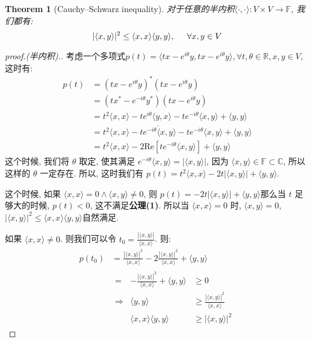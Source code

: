 \documentclass{article}
\newtheorem{theorem}{Theorem}
\def\<{\langle}
\def\>{\rangle}
\begin{document}
\begin{theorem}[Cauchy–Schwarz inequality]
  对于任意的半内积$\<\cdot,\cdot\>: V\times V\to \mathbb{F}$, 我们都有:
  \[|\<x, y\>|^2 \leq \<x, x\>\<y, y\>, \hspace{0.5cm} \forall x, y\in V\]
\end{theorem}
\begin{proof}[proof.(半内积).]
  考虑一个多项式$p(t) = \<tx - e^{i\theta}y, tx - e^{i\theta}y\>, \forall t, \theta\in\mathbb{R}, x, y\in V$, 这时有:
  \begin{align*}
    p(t) &= (tx - e^{i\theta}y)^*(tx - e^{i\theta}y) \\
         &= (tx^* - e^{-i\theta}y^*)(tx - e^{i\theta}y) \\
         &= t^2\<x, x\> - te^{i\theta}\<y, x\> - te^{-i\theta}\<x, y\> + \<y,y\> \\
         &= t^2\<x,x\> - \overline{te^{-i\theta}\<x, y\>}  - te^{-i\theta}\<x, y\> + \<y, y\> \\
    &= t^2\<x, x\> - 2\mathrm{Re}\left[te^{-i\theta}\<x, y\>\right] + \<y, y\>
  \end{align*}
  这个时候, 我们将 $\theta$ 取定, 使其满足 $e^{-i\theta} \<x, y\> = |\<x, y\>|$, 因为 $\<x, y\> \in \mathbb{F} \subset \mathbb{C}$, 所以这样的 $\theta$ 一定存在.
  所以, 这时我们有 $p(t) = t^2\<x,x\> - 2t|\<x, y\>| + \<y, y\>$.
  
  这个时候, 如果 $\<x, x\> = 0 \land \<x, y\> \not= 0$, 则 $p(t) = -2t|\<x, y\>| + \<y, y\>$那么当 $t$ 足够大的时候, $p(t) < 0$, 这不满足\textbf{公理(1)}.
  所以当 $\<x, x\> = 0$ 时, $\<x, y\> = 0$, $|\<x, y\>|^2 \leq \<x,x\>\<y,y\>$自然满足.

  如果 $\<x, x\> \not= 0$. 则我们可以令 $t_0 = \frac{|\<x, y\>|}{\<x,x\>}$.
  则:
  \begin{displaymath}
  \begin{array}{rl}
    p(t_0) &= \frac{|\<x,y\>|^2}{\<x,x\>} - 2\frac{|\<x,y\>|^2}{\<x,x\>} + \<y,y\> \\
           & \begin{array}{lrl}
                = & -\frac{|\<x,y\>|^2}{\<x,x\>} + \<y, y\> &\geq 0 \\
                \Rightarrow & \<y, y\> &\geq \frac{|\<x,y\>|^2}{\<x,x\>} \\
                & \<x, x\>\<y, y\> &\geq |\<x, y\>|^2 
              \end{array} 
  \end{array}
\end{displaymath}
\end{proof}
\end{document}
